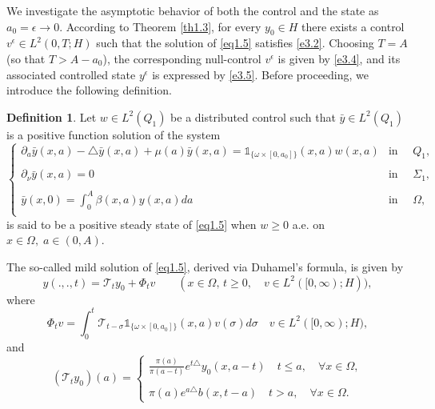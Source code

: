 \documentclass[10pt, a4]{amsart}
\theoremstyle{plain}
\theoremstyle{definition}
\newtheorem{definition}[lemma]{Definition}
\theoremstyle{remark}
\numberwithin{equation}{section}
\begin{document}
We investigate the asymptotic behavior of both the control and the state as \(a_0 = \epsilon \rightarrow 0\). According to Theorem \ref{th1.3}, for every \(y_0 \in H\) there exists a control \(v^{\epsilon} \in L^2(0,T;H)\) such that the solution of \eqref{eq1.5} satisfies \eqref{e3.2}. Choosing \(T = A\) (so that \(T > A-a_0\)), the corresponding null-control \(v^{\epsilon}\) is given by \eqref{e3.4}, and its associated controlled state \(y^{\epsilon}\) is expressed by \eqref{e3.5}.
Before proceeding, we introduce the following definition.
\begin{definition}\cite{ref3}
Let $w\in L^2(Q_1)$ be a distributed control such that  $\bar{y}\in  L^2(Q_1)$ is a positive function solution of the system
\begin{equation}\label{eq2.1} 
\left\lbrace 
\begin{array}{ll}
 \partial_{a}\bar{y}(x,a)-\triangle \bar{y}(x,a)+\mu(a) \bar{y}(x,a)=\mathds{1}_{\lbrace\omega\times[0,a_0]\rbrace}(x,a) w(x,a) &\text{in }\quad Q_1,\\
 \\\partial_{\nu}\bar{y}(x,a)=0 &\text{in }\quad\Sigma_1,\\
 \\\bar{y}(x,0)=\displaystyle\int_{0}^{A}\beta(x,a)y(x,a)da &\text{in }\quad\Omega,\\
\end{array}
\right.
\end{equation}
 is said to be a positive steady state of \eqref{eq1.5} when $w\geq 0$ a.e. on $x\in \Omega,\; a\in (0,A).$
\end{definition}
The so-called mild solution of \eqref{eq1.5}, derived via Duhamel's formula, is given by
\begin{equation}\label{eq2.2}
 y(.,.,t)=\mathcal{T}_t y_0 +\Phi_t v\qquad (x\in \Omega,\, t\geq 0,\quad v\in L^2([0,\infty);H)),
\end{equation}
where
\begin{equation}\label{eq2.3}
\Phi_tv =\int_0^t \mathcal{T}_{t-\sigma}\mathds{1}_{\lbrace\omega\times[0,a_0]\rbrace}(x,a)v(\sigma)d\sigma\quad v\in L^2([0,\infty);H),
\end{equation} 
 and 
\begin{equation}\label{eq2.4}
(\mathcal{T}_t y_0)(a)=\left\lbrace
\begin{array}{ll}
\frac{\pi(a)}{\pi(a-t)}e^{t\triangle}y_0(x,a-t)\quad t\leq a, \quad \forall x\in \Omega,\\
\\\pi(a)e^{a\triangle}b(x,t-a)\quad t> a, \quad \forall x\in \Omega.
\end{array}
\right.
\end{equation}   
\end{document}
